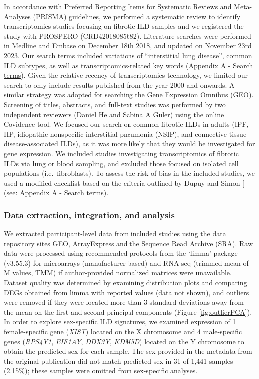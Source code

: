 \documentclass[
]{article}
\begin{document}
In accordance with Preferred Reporting Items for Systematic Reviews and Meta-Analyses (PRISMA) guidelines, we performed a systematic review to identify transcriptomics studies focusing on fibrotic ILD samples and we registered the study with PROSPERO (CRD42018085682). Literature searches were performed in Medline and Embase on December 18th 2018, and updated on November 23rd 2023. Our search terms included variations of ``interstitial lung disease'', common ILD subtypes, as well as transcriptomics-related key words (\hyperref[search-terms]{Appendix A - Search terms}). Given the relative recency of transcriptomics technology, we limited our search to only include results published from the year 2000 and onwards. A similar strategy was adopted for searching the Gene Expression Omnibus (GEO). Screening of titles, abstracts, and full-text studies was performed by two independent reviewers (Daniel He and Sabina A Guler) using the online Covidence tool. We focused our search on common fibrotic ILDs in adults (IPF, HP, idiopathic nonspecific interstitial pneumonia (NSIP), and connective tissue disease-associated ILDs), as it was more likely that they would be investigated for gene expression. We included studies investigating transcriptomics of fibrotic ILDs via lung or blood sampling, and excluded those focused on isolated cell populations (i.e.~fibroblasts). To assess the risk of bias in the included studies, we used a modified checklist based on the criteria outlined by Dupuy and Simon {[}\citeproc{ref-dupuy_critical_2007}{40}{]} (see: \hyperref[qc]{Appendix A - Search terms}).

\subsubsection{Data extraction, integration, and analysis}\label{data-extraction-integration-and-analysis}

We extracted participant-level data from included studies using the data repository sites GEO, ArrayExpress and the Sequence Read Archive (SRA). Raw data were processed using recommended protocols from the `limma' package (v3.55.3) for microarrays (manufacturer-based) and RNA-seq (trimmed mean of M values, TMM) if author-provided normalized matrices were unavailable. Dataset quality was determined by examining distribution plots and comparing DEGs obtained from limma with reported values (data not shown), and outliers were removed if they were located more than 3 standard deviations away from the mean on the first and second principal components (Figure \ref{fig:outlierPCA}). In order to explore sex-specific ILD signatures, we examined expression of 1 female-specific gene (\textit{XIST}) located on the X chromosome and 4 male-specific genes (\textit{RPS4Y1}, \textit{EIF1AY}, \textit{DDX3Y}, \textit{KDM5D}) located on the Y chromosome to obtain the predicted sex for each sample. The sex provided in the metadata from the original publication did not match predicted sex in 31 of 1,441 samples (2.15\%); these samples were omitted from sex-specific analyses.
\end{document}

